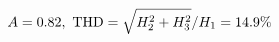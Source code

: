 \documentclass[preview]{standalone}
\begin{document}
\begin{align*}
\special{dvisvgm:raw <g id='unique000'>}A=0.82,\ \text{THD}=\sqrt{H_2^2+H_3^2}/H_1=14.9\%\special{dvisvgm:raw </g>}
\end{align*}
\end{document}
